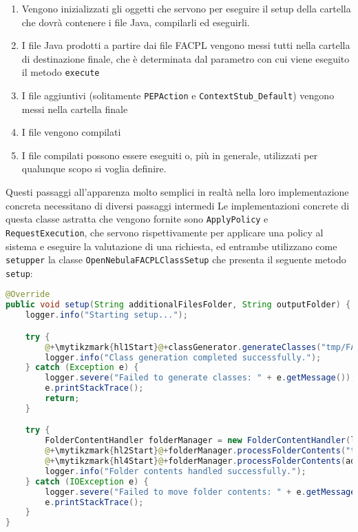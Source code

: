 \begin{enumerate}
    \item Vengono inizializzati gli oggetti che servono per eseguire il setup della cartella che dovrà contenere i file Java, compilarli ed eseguirli.
    \item I file Java prodotti a partire dai file FACPL vengono messi tutti nella cartella di destinazione finale, che è determinata dal parametro con cui viene eseguito il metodo \texttt{execute}
    \item I file aggiuntivi (solitamente \texttt{PEPAction} e \texttt{ContextStub\_Default}) vengono messi nella cartella finale
    \item I file vengono compilati
    \item I file compilati possono essere eseguiti o, più in generale, utilizzati per qualunque scopo si voglia definire.
\end{enumerate}
Questi passaggi all'apparenza molto semplici in realtà nella loro implementazione concreta necessitano di diversi passaggi intermedi\medbreak
Le implementazioni concrete di questa classe astratta che vengono fornite sono \texttt{ApplyPolicy} e \texttt{RequestExecution}, che servono rispettivamente per applicare una policy al sistema e eseguire la valutazione di una richiesta, ed entrambe utilizzano come \texttt{setupper} la classe \texttt{OpenNebulaFACPLClassSetup} che presenta il seguente metodo \texttt{setup}:
\begin{lstlisting}[language=Java, caption=Metodo di setup per OpenNebula, label=code:setupper]
@Override
public void setup(String additionalFilesFolder, String outputFolder) {
    logger.info("Starting setup...");

    try {
        @+\mytikzmark{hl1Start}@+classGenerator.generateClasses("tmp/FACPLFiles");@+\mytikzmark{hl1End}@+
        logger.info("Class generation completed successfully.");
    } catch (Exception e) {
        logger.severe("Failed to generate classes: " + e.getMessage());
        e.printStackTrace();
        return;
    }

    try {
        FolderContentHandler folderManager = new FolderContentHandler(logger);
        @+\mytikzmark{hl2Start}@+folderManager.processFolderContents("tmp/FACPLFiles/",@+\mytikzmark{hl2End}@+ @+\mytikzmark{hl3Start}@+outputFolder, new MoveStrategy());@+\mytikzmark{hl3End}@+
        @+\mytikzmark{hl4Start}@+folderManager.processFolderContents(additionalFilesFolder,@+\mytikzmark{hl4End}@+ @+\mytikzmark{hl5Start}@+outputFolder, new CopyStrategy());@+\mytikzmark{hl5End}@+
        logger.info("Folder contents handled successfully.");
    } catch (IOException e) {
        logger.severe("Failed to move folder contents: " + e.getMessage());
        e.printStackTrace();
    }
}
\end{lstlisting}
